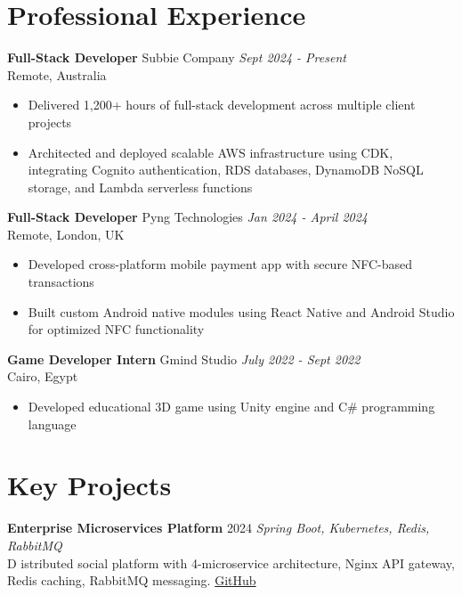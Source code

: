 \documentclass[8pt,a4paper]{article}
\newcommand{\cventry}[4]{%
    \textbf{#1} \hfill {\small\color{secondarycolor} #2} \hfill {\footnotesize\textit{#3}}\\
    #4
    \vspace{0.02em}
}
\begin{document}

\section{Professional Experience}

\cventry{Full-Stack Developer}{Subbie Company}{Sept 2024 - Present}{Remote, Australia}{}{
\begin{itemize}
    \item Delivered 1,200+ hours of full-stack development across multiple client projects
    \item Architected and deployed scalable AWS infrastructure using CDK, integrating Cognito authentication, RDS databases, DynamoDB NoSQL storage, and Lambda serverless functions
   
\end{itemize}
}
\cventry{Full-Stack Developer}{Pyng Technologies}{Jan 2024 - April 2024}{Remote, London, UK}
\begin{itemize}
    \item Developed cross-platform mobile payment app with secure NFC-based transactions
    \item Built custom Android native modules using React Native and Android Studio for optimized NFC functionality
\end{itemize}




\cventry{Game Developer Intern}{Gmind Studio}{July 2022 - Sept 2022}{Cairo, Egypt}{}{
\begin{itemize}
    \item Developed educational 3D game using Unity engine and C\# programming language

\end{itemize}
}

\section{Key Projects}

\cventry{Enterprise Microservices Platform}{2024}{Spring Boot, Kubernetes, Redis, RabbitMQ}
Distributed social platform with 4-microservice architecture, Nginx API gateway, Redis caching, RabbitMQ messaging. \href{https://github.com/mariamhmostafa/FinalProject-29-Cache_Me_If_You_Can}{GitHub}
\end{document}
